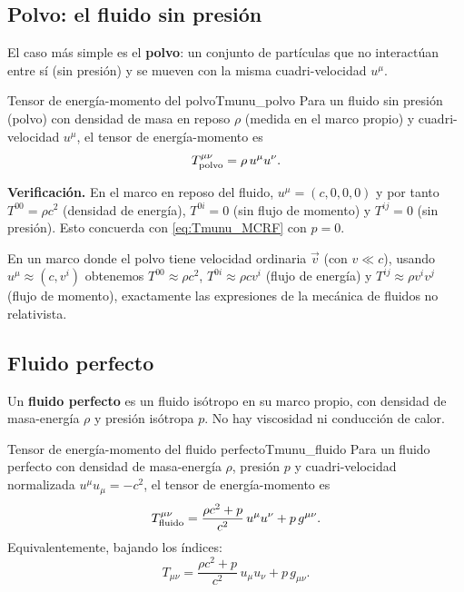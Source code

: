\subsection{Polvo: el fluido sin presión}

El caso más simple es el \textbf{polvo}: un conjunto de partículas que no interactúan entre sí (sin presión) y se mueven con la misma cuadri-velocidad $u^\mu$.

\begin{definicion}{Tensor de energía-momento del polvo}{Tmunu_polvo}
Para un fluido sin presión (polvo) con densidad de masa en reposo $\rho$ (medida en el marco propio) y cuadri-velocidad $u^\mu$, el tensor de energía-momento es
\begin{equation}
  T^{\mu\nu}_{\rm polvo} = \rho\,u^\mu u^\nu.
  \label{eq:Tmunu_polvo}
\end{equation}
\end{definicion}

\textbf{Verificación.} En el marco en reposo del fluido, $u^\mu = (c, 0, 0, 0)$ y por tanto $T^{00} = \rho c^2$ (densidad de energía), $T^{0i} = 0$ (sin flujo de momento) y $T^{ij} = 0$ (sin presión). Esto concuerda con \eqref{eq:Tmunu_MCRF} con $p = 0$.

En un marco donde el polvo tiene velocidad ordinaria $\vec{v}$ (con $v \ll c$), usando $u^\mu \approx (c, v^i)$ obtenemos $T^{00} \approx \rho c^2$, $T^{0i} \approx \rho c v^i$ (flujo de energía) y $T^{ij} \approx \rho v^i v^j$ (flujo de momento), exactamente las expresiones de la mecánica de fluidos no relativista.

\subsection{Fluido perfecto}

Un \textbf{fluido perfecto} es un fluido isótropo en su marco propio, con densidad de masa-energía $\rho$ y presión isótropa $p$. No hay viscosidad ni conducción de calor.

\begin{definicion}{Tensor de energía-momento del fluido perfecto}{Tmunu_fluido}
Para un fluido perfecto con densidad de masa-energía $\rho$, presión $p$ y cuadri-velocidad normalizada $u^\mu u_\mu = -c^2$, el tensor de energía-momento es
\begin{equation}
  T^{\mu\nu}_{\rm fluido} = \frac{\rho c^2 + p}{c^2}\,u^\mu u^\nu + p\,g^{\mu\nu}.
  \label{eq:Tmunu_fluido}
\end{equation}
Equivalentemente, bajando los índices:
\begin{equation}
  T_{\mu\nu} = \frac{\rho c^2 + p}{c^2}\,u_\mu u_\nu + p\,g_{\mu\nu}.
\end{equation}
\end{definicion}

